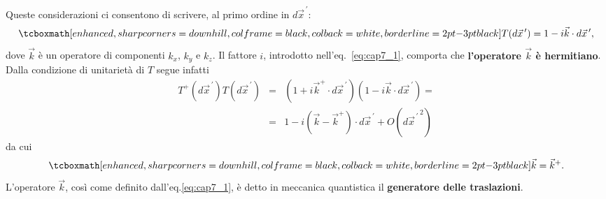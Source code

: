 Queste considerazioni ci consentono di scrivere, al primo ordine in $d{\vec{x}}^{\, \prime}$:
	\begin{equation}
		\label{eq:cap7_1}
		\tcboxmath[enhanced, sharp corners=downhill, colframe=black, colback=white, borderline={2pt}{-3pt}{black}]{
			T(d{\vec{x}}^{\, \prime})=1-i\vec{k}\cdot d{\vec{x}}^{\, \prime} ,
			}
	\end{equation}
dove $\vec{k}$ è un operatore di componenti $k_x$, $k_y$ e $k_z$. Il fattore $i$, introdotto nell'eq.~\eqref{eq:cap7_1}, comporta che \textbf{l'operatore ${\vec{k}}$ è hermitiano}. Dalla condizione di unitarietà di $T$ segue infatti
	\begin{eqnarray}
		T^+(d{\vec{x}}^{\, \prime}) T(d{\vec{x}}^{\, \prime}) & = & \left(1+i\vec{k}^{+}\cdot d{\vec{x}}^{\, \prime}\right) \left(1-i\vec{k}\cdot d{\vec{x}}^{\, \prime}\right) = \nonumber \\ 
		& = & 1-i\left(\vec{k}-\vec{k}^{+}\right)\cdot d{\vec{x}}^{\, \prime}+O({d{\vec{x}}^{\, \prime} }^{\, 2}) 
	\end{eqnarray}
da cui
	\begin{equation}
		\tcboxmath[enhanced, sharp corners=downhill, colframe=black, colback=white, borderline={2pt}{-3pt}{black}]{	
			\vec{k}=\vec{k}^+ .
			}
	\end{equation}
L'operatore $\vec{k}$, così come definito dall'eq.\eqref{eq:cap7_1}, è detto in meccanica quantistica il \textbf{generatore delle traslazioni}.\\

